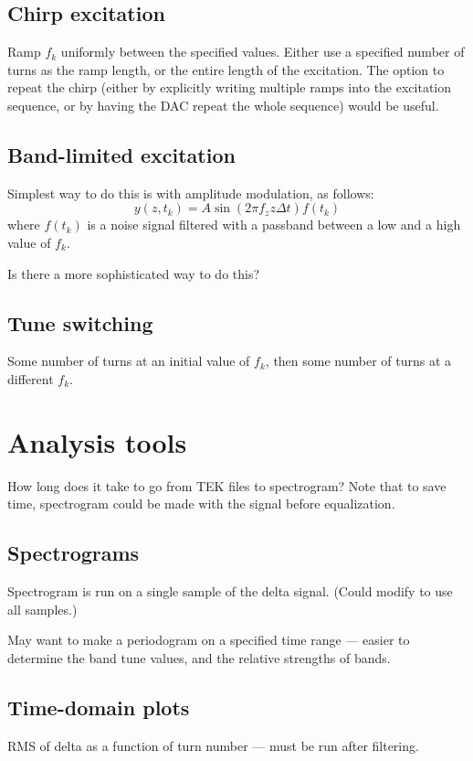 \documentclass{article}
\begin{document}
\subsection{Chirp excitation}

Ramp $f_k$ uniformly between the specified values. Either use a specified number of turns as the ramp length, or the entire length of the excitation. The option to repeat the chirp (either by explicitly writing multiple ramps into the excitation sequence, or by having the DAC repeat the whole sequence) would be useful.

\subsection{Band-limited excitation}
Simplest way to do this is with amplitude modulation, as follows:
$$y(z,t_k) = A \sin(2\pi f_z z \Delta t)f(t_k)$$
where $f(t_k)$ is a noise signal filtered with a passband between a low and a high value of $f_k$.

Is there a more sophisticated way to do this?

\subsection{Tune switching}
Some number of turns at an initial value of $f_k$, then some number of turns at a different $f_k$.

\section{Analysis tools}
How long does it take to go from TEK files to spectrogram? Note that to save time, spectrogram could be made with the signal before equalization.

\subsection{Spectrograms}
Spectrogram is run on a single sample of the delta signal. (Could modify to use all samples.)

May want to make a periodogram on a specified time range --- easier to determine the band tune values, and the relative strengths of bands.
\subsection{Time-domain plots}
RMS of delta as a function of turn number --- must be run after filtering.
\end{document}

